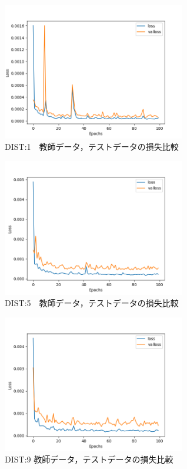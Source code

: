 \documentclass{jreport}		%
\begin{document}
\begin{figure}[htbp]
 \begin{center}
  \includegraphics[width=80mm]{gain1_loss_hikaku.png}
 \end{center}
 \caption{DIST:1　教師データ，テストデータの損失比較}
 \label{fig:one}
\end{figure}

\begin{figure}[htbp]
 \begin{center}
  \includegraphics[width=80mm]{gain5_loss_hikaku.png}
 \end{center}
 \caption{DIST:5　教師データ，テストデータの損失比較}
 \label{fig:one}
\end{figure}

\begin{figure}[htbp]
 \begin{center}
  \includegraphics[width=80mm]{gain10_loss_hikaku.png}
 \end{center}
 \caption{DIST:9 教師データ，テストデータの損失比較}
 \label{fig:one}
\end{figure}
\end{document}
